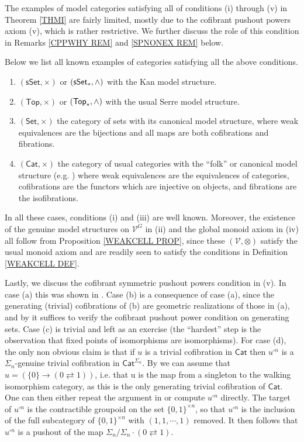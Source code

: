 \documentclass[a4paper,10pt
,draft
]{article}%
\numberwithin{equation}{section}
\numberwithin{figure}{section}
\theoremstyle{definition} %
\newcommand{\Cat}{\mathsf{Cat}}
\newcommand{\V}{\ensuremath{\mathcal V}}
\newcommand{\1}{\ensuremath{\mathbbm 1}}%
\begin{document}
The examples of 
model categories satisfying 
all of conditions (i) through (v)
in Theorem \ref{THMI}
are fairly limited, 
mostly due to 
the cofibrant pushout powers axiom (v),
which is rather restrictive.
We further discuss the role of this condition 
in Remarks 
\ref{CPPWHY REM} and
\ref{SPNONEX REM} below.

Below we list all known examples of categories satisfying all the above conditions.
\begin{enumerate}[label = (\alph*)]
\item $(\mathsf{sSet},\times)$ or $(\mathsf{sSet}_{\**},\wedge)$
with the Kan model structure.
\item $(\mathsf{Top},\times)$ or $(\mathsf{Top}_{\**},\wedge)$
with the usual Serre model structure.
\item $(\mathsf{Set},\times)$ the category of sets with its canonical model structure,
where weak equivalences are the bijections and all maps are both cofibrations and fibrations.
\item $(\Cat,\times)$ the category of usual categories
with the ``folk'' or canonical model structure (e.g. \cite{Rez})
where weak equivalences are the equivalences of categories,
cofibrations are the functors which are injective on objects,
and fibrations are the isofibrations.
\end{enumerate}
In all these cases, conditions (i) and (iii) %
are well known.
Moreover,
the existence of the genuine model structures on $\V^G$ in (ii)
and the global monoid axiom in (iv)
all follow from Proposition \ref{WEAKCELL PROP},
since these $(\V,\otimes)$ satisfy the usual monoid axiom and
are readily seen to satisfy the conditions in Definition \ref{WEAKCELL DEF}.


Lastly, we discuss the cofibrant symmetric pushout powers condition in (v).
In case (a) this was shown in 
\cite[Ex. 6.19]{BP_geo}.
Case (b) is a consequence of case (a), 
since the generating (trivial) cofibrations of (b) are geometric realizations of those in (a),
and by \cite[Rmk. 6.17]{BP_geo}
it suffices to verify the cofibrant pushout power condition
on generating sets.
Case (c) is trivial and left as an exercise 
(the ``hardest'' step is the observation that fixed points of isomorphisms are isomorphisms).
For case (d), the only non obvious claim is that
if $u$ is a trivial cofibration in $\mathsf{Cat}$
then $u^{\square n}$
is a $\Sigma_n$-genuine trivial cofibration in $\mathsf{Cat}^{\Sigma_n}$.
By \cite[Rmk. 6.17]{BP_geo}
we can assume that $u = \left(\{0\} \to (0\rightleftarrows 1)\right)$,
i.e. that u is the map from a singleton to the walking isomorphism category,
as this is the only generating trivial cofibration of 
$\mathsf{Cat}$.
One can then either repeat the argument in \cite[Ex. 6.19]{BP_geo}
or compute $u^{\square n}$ directly.
The target of $u^{\square n}$
is the contractible groupoid on the set $\{0,1\}^{\times n}$,
so that $u^{\square n}$
is the inclusion of the full subcategory of 
$\{0,1\}^{\times n}$
with $(1,1,\cdots,1)$ removed.
It then follows that $u^{\square n}$
is a pushout of the map
$\Sigma_n/\Sigma_n \cdot (0 \rightleftarrows 1)$.
\end{document}
